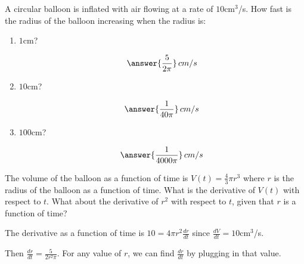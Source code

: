 \documentclass{ximera}
\author{Gregory Hartman \and Matthew Carr}
\begin{document}
\begin{exercise}



A circular balloon is inflated with air flowing at a rate of
$10$cm$^3$/s. How fast is the radius of the balloon increasing when
the radius is:
\begin{enumerate}
\item $1$cm? \begin{prompt}\[\answer{\frac{5}{2\pi}}\,cm/s\]\end{prompt}
\item $10$cm? \begin{prompt}\[\answer{\frac{1}{40\pi}}\,cm/s\]\end{prompt}
\item $100$cm? \begin{prompt}\[\answer{\frac{1}{4000\pi}}\,cm/s\]\end{prompt}
\end{enumerate}

\begin{hint}
The volume of the balloon as a function of time is
$V(t)=\frac{4}{3}\pi r^3$ where $r$ is the radius of the balloon as a
function of time. What is the derivative of $V(t)$ with respect to
$t$. What about the derivative of $r^2$ with respect to $t$, given
that $r$ is a function of time?
\end{hint}
\begin{hint}
The derivative as a function of time is $10=4\pi r^2\frac{dr}{dt}$
since $\frac{dV}{dt}=10$cm$^3$/s.
\end{hint}
\begin{hint}
Then $\frac{dr}{dt}=\frac{5}{2r^2\pi}$. For any value of $r$, we can
find $\frac{dr}{dt}$ by plugging in that value.
\end{hint}
\end{exercise}
\end{document}
